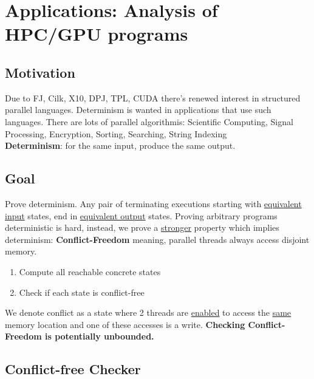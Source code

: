 \chapter{Applications: Analysis of HPC/GPU programs}
\section{Motivation}
Due to FJ, Cilk, X10, DPJ, TPL, CUDA there's renewed interest in structured parallel languages. Determinism is wanted in applications that use such languages. There are lots of parallel algorithmis: Scientific Computing, Signal Processing, Encryption, Sorting, Searching, String Indexing\\
\textbf{Determinism}: for the same input, produce the same output.

\section{Goal}
Prove determinism. Any pair of terminating executions starting with \underline{equivalent input} states, end in \underline{equivalent output} states. Proving arbitrary programs deterministic is hard, instead, we prove a \underline{stronger} property which implies determinism: \textbf{Conflict-Freedom} meaning, parallel threads always access disjoint memory.
\begin{enumerate}
\item Compute all reachable concrete states
\item Check if each state is conflict-free
\end{enumerate}
We denote conflict as a state where 2 threads are \underline{enabled} to access the \underline{same} memory location and one of these accesses is a write.
\textbf{Checking Conflict-Freedom is potentially unbounded.}

\section{Conflict-free Checker}
\label{conflict_free_checker}


